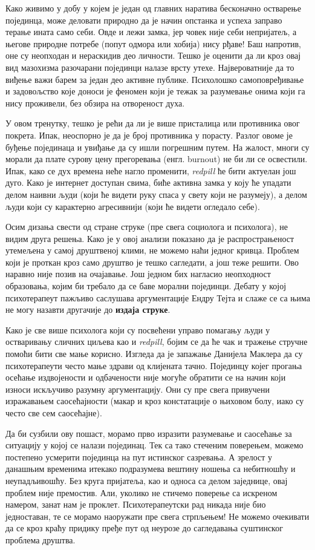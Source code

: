 \documentclass[b5paper]{article}
\begin{document}
Како живимо у добу у којем је један од главних наратива бесконачно остварење појединца, може деловати природно да је начин опстанка и успеха заправо терање ината само себи. Овде и лежи замка, јер човек није себи непријатељ, а његове природне потребе (попут одмора или хобија) нису рђаве! Баш напротив, оне су неопходан и нераскидив део личности. Тешко је оценити да ли кроз овај вид мазохизма разочарани појединци налазе врсту утехе. Највероватније да то виђење важи барем за један део активне публике. Психолошко самоповређивање и задовољство које доноси је феномен који је тежак за разумевање онима који га нису проживели, без обзира на отвореност духа.

У овом тренутку, тешко је рећи да ли је више присталица или противника овог покрета. Ипак, неоспорно је да је број противника у порасту. Разлог овоме је буђење појединаца и увиђање да су ишли погрешним путем. На жалост, многи су морали да плате сурову цену прегоревања (енгл. burnout) не би ли се освестили. Ипак, како се дух времена неће нагло променити, \textit{redpill} ће бити актуелан још дуго. Како је интернет доступан свима, биће активна замка у коју ће упадати делом наивни људи (који ће видети руку спаса у свету који не разумеју), а делом људи који су карактерно агресивнији (који ће видети огледало себе).

Осим дизања свести од стране струке (пре свега социолога и психолога), не видим друга решења. Како је у овој анализи показано да је распрострањеност утемељена у самој друштвеној клими, не можемо наћи једног кривца. Проблем који је проткан кроз само друштво је тешко сагледати, а још теже решити. Ово наравно није позив на очајавање. Још једном бих нагласио неопходност образовања, којим би требало да се баве морални појединци. Дебату у којој психотерапеут пажљиво саслушава аргументације Ендру Тејта и слаже се са њима не могу назавти другачије до \textbf{издаја струке}.

Како је све више психолога који су посвећени управо помагању људи у остваривању сличних циљева као и \textit{redpill}, бојим се да ће чак и тражење стручне помоћи бити све мање корисно. Изгледа да је запажање Данијела Маклера да су психотерапеути често мање здрави од клијената тачно. Појединцу којег прогања осећање издвојености и одбачености није могуће обратити се на начин који износи искључиво разумну аргументацију. Они су пре свега привучени изражавањем саосећајности (макар и кроз констатације о њиховом болу, иако су често све сем саосећајне).

Да би сузбили ову пошаст, морамо прво изразити разумевање и саосећање за ситуацију у којој се налази појединац. Тек са тако стеченим поверењем, можемо постепено усмерити појединца на пут истинског сазревања. А зрелост у данашњим временима итекако подразумева вештину ношења са небитношћу и неупадљивошћу. Без круга пријатеља, као и односа са делом заједнице, овај проблем није премостив. Али, уколико не стичемо поверење са искреном намером, занат нам је проклет. Психотерапеутски рад никада није био једноставан, те се морамо наоружати пре свега стрпљењем! Не можемо очекивати да се кроз краћу придику пређе пут од неурозе до сагледавања суштинског проблема друштва.
\end{document}
